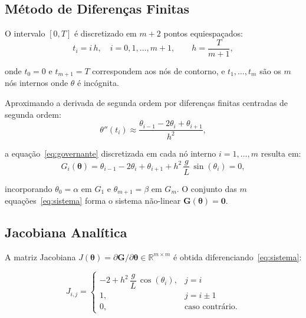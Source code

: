 \documentclass[
  12pt,
  a4paper,
  chapter=TITLE,
  section=TITLE,
  brazil,
  oneside
]{abntex2}
\begin{document}
\subsection{Método de Diferenças Finitas}

O intervalo $[0, T]$ é discretizado em $m+2$ pontos equiespaçados:
\begin{equation}
  t_i = i\,h, \quad i = 0, 1, \ldots, m+1,
  \qquad h = \frac{T}{m+1},
\end{equation}

\noindent onde $t_0 = 0$ e $t_{m+1} = T$ correspondem aos nós de contorno, e
$t_1, \ldots, t_m$ são os $m$ nós internos onde $\theta$ é incógnita.

Aproximando a derivada de segunda ordem por diferenças finitas centradas de segunda
ordem:
\begin{equation}
  \theta''(t_i) \approx \frac{\theta_{i-1} - 2\theta_i + \theta_{i+1}}{h^2},
\end{equation}

\noindent a equação~\eqref{eq:governante} discretizada em cada nó interno
$i = 1, \ldots, m$ resulta em:
\begin{equation}
  G_i(\boldsymbol{\theta}) =
    \theta_{i-1} - 2\theta_i + \theta_{i+1}
    + h^2\,\frac{g}{L}\,\sin(\theta_i) = 0,
  \label{eq:sistema}
\end{equation}

\noindent incorporando $\theta_0 = \alpha$ em $G_1$ e $\theta_{m+1} = \beta$ em $G_m$.
O conjunto das $m$ equações~\eqref{eq:sistema} forma o sistema não-linear
$\mathbf{G}(\boldsymbol{\theta}) = \mathbf{0}$.

\subsection{Jacobiana Analítica}

A matriz Jacobiana $J(\boldsymbol{\theta}) = \partial\mathbf{G}/\partial\boldsymbol{\theta}
\in \mathbb{R}^{m \times m}$ é obtida diferenciando~\eqref{eq:sistema}:

\begin{equation}
  J_{i,j} =
  \begin{cases}
    -2 + h^2\,\dfrac{g}{L}\,\cos(\theta_i), & j = i   \\[6pt]
    1,                                        & j = i \pm 1 \\
    0,                                        & \text{caso contrário.}
  \end{cases}
  \label{eq:jacobiana}
\end{equation}
\end{document}
